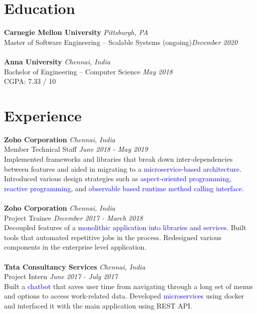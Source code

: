 \documentclass{resume}
\author{https://aravindvasu.dev}{Aravind Vasudevan}
\begin{document}
\maketitle
\section*{Education}
\noindent
\textbf{Carnegie Mellon University} \hfill \textit{Pittsburgh, PA} \\
{\small Master of Software Engineering -- Scalable Systems} (ongoing)\hfill \textit{\small December 2020}  \\
\\
\textbf{Anna University} \hfill \textit{Chennai, India} \\
{\small Bachelor of Engineering -- Computer Science} \hfill \textit{\small May 2018}  \\
{\small CGPA: 7.33 / 10} 

\section*{Experience}
\noindent
\textbf{Zoho Corporation} \hfill \textit{Chennai, India} \\
{\small Member Technical Staff} \hfill \textit{\small June 2018 - May 2019}  \\
Implemented frameworks and libraries that break down inter-dependencies between features and aided in migrating to a \textcolor{blue}{microservice-based architecture}. Introduced various design strategies such as \textcolor{blue}{aspect-oriented programming,} \textcolor{blue}{reactive programming}, and \textcolor{blue}{observable based runtime method calling interface}.\\
\\
\textbf{Zoho Corporation} \hfill \textit{Chennai, India} \\
{\small Project Trainee} \hfill \textit{\small December 2017 - March 2018}  \\
Decoupled features of a \textcolor{blue}{monolithic application into libraries and services}. Built tools that automated repetitive jobs in the process. Redesigned various components in the enterprise level application.\\
\\
\textbf{Tata Consultancy Services} \hfill \textit{Chennai, India} \\
{\small Project Intern} \hfill \textit{\small June 2017 - July 2017}  \\
Built a \textcolor{blue}{chatbot} that saves user time from navigating through a long set of menus and options to access work-related data. Developed \textcolor{blue}{microservices} using docker and interfaced it with the main application using REST API.
\end{document}
